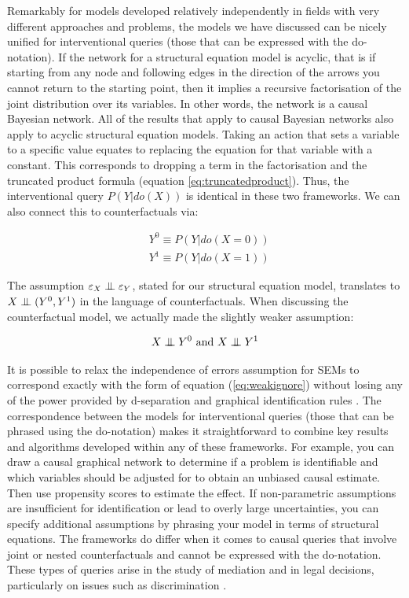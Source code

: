 \documentclass[11pt,a4paper,oneside]{book}
\theoremstyle{plain}
\theoremstyle{definition}
\let\epsilon\varepsilon
\newcommand{\ci}{\mathrel{\perp\mspace{-10mu}\perp}}
\begin{document}
Remarkably for models developed relatively independently in fields with very different approaches and problems, the models we have discussed can be nicely unified for interventional queries (those that can be expressed with the do-notation). If the network for a structural equation model is acyclic, that is if starting from any node and following edges in the direction of the arrows you cannot return to the starting point, then it implies a recursive factorisation of the joint distribution over its variables. In other words, the network is a causal Bayesian network. All of the results that apply to causal Bayesian networks also apply to acyclic structural equation models.  Taking an action that sets a variable to a specific value equates to replacing the equation for that variable with a constant. This corresponds to dropping a term in the factorisation and the truncated product formula (equation \ref{eq:truncatedproduct}). Thus, the interventional query $P(Y|do(X))$ is identical in these two frameworks. We can also connect this to counterfactuals via:

\begin{equation}
\begin{aligned}
&Y^{0} \equiv P(Y|do(X=0)) \\
&Y^{1} \equiv P(Y|do(X=1))
\end{aligned}
\end{equation}

The assumption $\epsilon_{X} \ci \epsilon_{Y}$, stated for our structural equation model, translates to $X \ci (Y^{0},Y^{1})$ in the language of counterfactuals. When discussing the counterfactual model, we actually made the slightly weaker assumption:

\begin{equation}
\label{eq:weakignore}
X \ci Y^{0} \text{ and } X \ci Y^{1}
\end{equation}

It is possible to relax the independence of errors assumption for SEMs to correspond exactly with the form of equation (\ref{eq:weakignore}) without losing any of the power provided by d-separation and graphical identification rules \citep{Richardson2013}. The correspondence between the models for interventional queries (those that can be phrased using the do-notation) makes it straightforward to combine key results and algorithms developed within any of these frameworks. For example, you can draw a causal graphical network to determine if a problem is identifiable and which variables should be adjusted for to obtain an unbiased causal estimate. Then use propensity scores \citep{Rosenbaum1983} to estimate the effect. If non-parametric assumptions are insufficient for identification or lead to overly large uncertainties, you can specify additional assumptions by phrasing your model in terms of structural equations. The frameworks do differ when it comes to causal queries that involve joint or nested counterfactuals and cannot be expressed with the do-notation. These types of queries arise in the study of mediation \citep{Pearl2014,Imai2010a,VanderWeele2011} and in legal decisions, particularly on issues such as discrimination \citep{Pearl2000}. 
\end{document}
